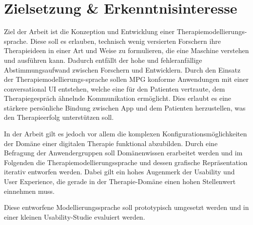 
\section{Zielsetzung \& Erkenntnisinteresse}
\label{ch:Zielsetzung}


Ziel der Arbeit ist die Konzeption und Entwicklung einer Therapiemodellierungs-sprache. Diese soll es erlauben, technisch wenig versierten Forschern ihre Therapieideen in einer Art und Weise zu formulieren, die eine Maschine verstehen und ausführen kann. Dadurch entfällt der hohe und fehleranfällige Abstimmungsaufwand zwischen Forschern und Entwicklern. Durch den Einsatz der Therapiemodellierungs-sprache sollen MPG konforme Anwendungen mit einer conversational UI entstehen, welche eine für den Patienten vertraute, dem Therapiegespräch ähnelnde Kommunikation ermöglicht. Dies erlaubt es eine stärkere persönliche Bindung zwischen App und dem Patienten herzustellen, was den Therapieerfolg unterstützen soll. 

In der Arbeit gilt es jedoch vor allem die komplexen Konfigurationsmöglichkeiten der Domäne einer digitalen Therapie funktional abzubilden. Durch eine Befragung der Anwendergruppen soll Domänenwissen erarbeitet werden und im Folgenden die Therapiemodellierungssprache und dessen grafische Repräsentation iterativ entworfen werden. Dabei gilt ein hohes Augenmerk der Usability und User Experience, die gerade in der Therapie-Domäne einen hohen Stellenwert einnehmen muss.

Diese entworfene Modellierungssprache soll prototypisch umgesetzt werden und in einer kleinen Usability-Studie evaluiert werden.
